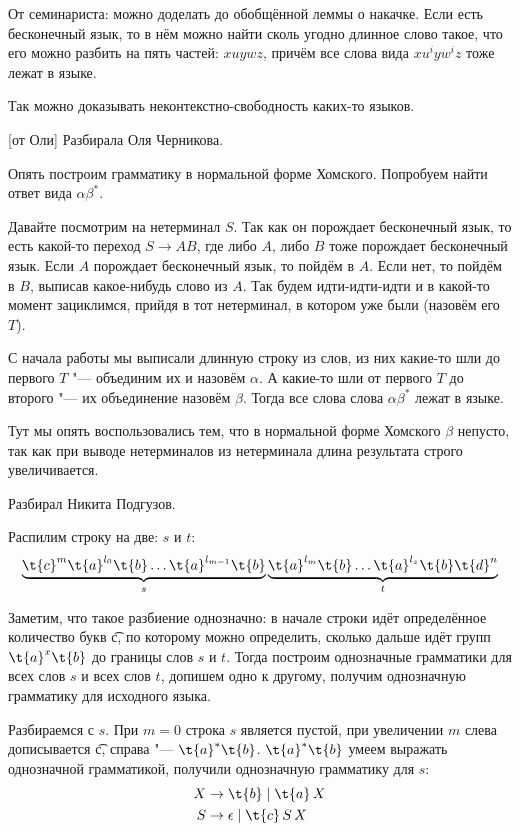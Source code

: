 	\begin{Rem}
		От семинариста: можно доделать до обобщённой леммы о накачке.
		Если есть бесконечный язык, то в нём можно найти сколь угодно длинное слово такое,
		что его можно разбить на пять частей: $xuywz$, причём все слова вида
		$xu^iyw^iz$ тоже лежат в языке.

		Так можно доказывать неконтекстно-свободность каких-то языков.
	\end{Rem}

[от Оли]
	Разбирала Оля Черникова.

	Опять построим грамматику в нормальной форме Хомского.
	Попробуем найти ответ вида $\alpha\beta^*$.

	Давайте посмотрим на нетерминал $S$.
	Так как он порождает бесконечный язык, то есть какой-то переход $S \to AB$,
	где либо $A$, либо $B$ тоже порождает бесконечный язык.
	Если $A$ порождает бесконечный язык, то пойдём в $A$.
	Если нет, то пойдём в $B$, выписав какое-нибудь слово из $A$.
	Так будем идти-идти-идти и в какой-то момент зациклимся, прийдя в тот нетерминал, в котором уже были (назовём его $T$).

	С начала работы мы выписали длинную строку из слов, из них какие-то шли до первого $T$ "--- объединим их и назовём $\alpha$.
	А какие-то шли от первого $T$ до второго "--- их объединение назовём $\beta$.
	Тогда все слова слова $\alpha\beta^*$ лежат в языке.
	\begin{Rem}
		Тут мы опять воспользовались тем, что в нормальной форме Хомского $\beta$ непусто,
		так как при выводе нетерминалов из нетерминала длина результата строго увеличивается.
	\end{Rem}

	Разбирал Никита Подгузов.

	Распилим строку на две: $s$ и $t$:
	\[
		\underbrace{\t{c}^m \t{a}^{l_0} \t{b} \dots \t{a}^{l_{m-1}} \t{b}}_{s} \underbrace{\t{a}^{l_m}\t{b} \dots \t{a}^{l_z} \t{b} \t{d}^n}_{t}
	\]

	Заметим, что такое разбиение однозначно: в начале строки идёт определённое количество букв \t{c},
	по которому можно определить, сколько дальше идёт групп $\t{a}^x\t{b}$ до границы слов $s$ и $t$.
	Тогда построим однозначные грамматики для всех слов $s$ и всех слов $t$, допишем одно к другому,
	получим однозначную грамматику для исходного языка.

	Разбираемся с $s$.
	При $m=0$ строка $s$ является пустой, при увеличении $m$ слева дописывается \t{c}, справа "--- $\t{a}^*\t{b}$.
	$\t{a}^*\t{b}$ умеем выражать однозначной грамматикой, получили однозначную грамматику для $s$:
	\begin{align*}
		X &\to \t{b} \mid \t{a}\,X \\
		S &\to \epsilon \mid \t{c}\,S\,X
	\end{align*}


